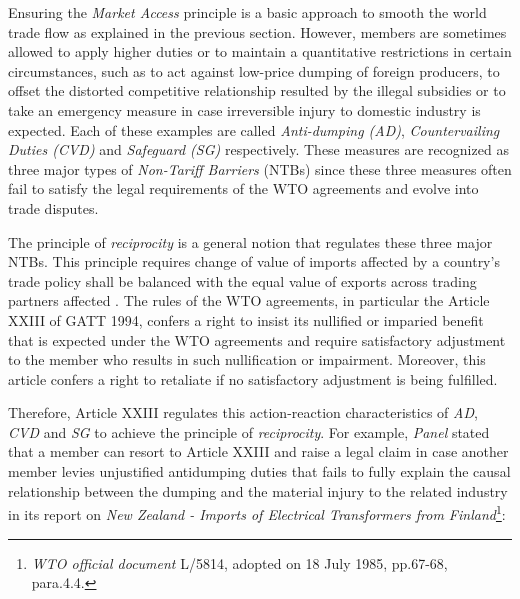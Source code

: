 
 
Ensuring the \textit{Market Access} principle
is a basic approach to smooth the world trade flow as explained in the previous section. %
However, members are sometimes allowed to apply higher duties or to maintain a quantitative restrictions in certain circumstances, such as
to act against low-price dumping of foreign producers, to offset the distorted competitive relationship resulted by the illegal subsidies
or to take an emergency measure in case irreversible injury to domestic industry is expected. Each of these examples
are called \textit{Anti-dumping (AD)}, \textit{Countervailing Duties (CVD)} and \textit{Safeguard (SG)} respectively. These measures are recognized as
three major types of \textit{Non-Tariff Barriers} (NTBs) %
since these three measures often fail to satisfy the legal requirements of the WTO agreements and evolve into trade disputes.
 
The principle of \textit{reciprocity} is a general notion that regulates these three major NTBs.
This principle requires change of value of imports affected by a country's trade policy
shall be balanced with the equal value of exports across trading partners affected \citep{bagwell1999}.
The rules of the WTO agreements, in particular the Article XXIII of GATT 1994,
confers a right to insist its nullified or imparied benefit that is expected under the WTO agreements and require satisfactory adjustment to the member
who results in such nullification or impairment. Moreover, this article confers a right to retaliate if no satisfactory adjustment is being fulfilled.
 
Therefore, Article XXIII regulates this action-reaction characteristics of \textit{AD}, \textit{CVD} and \textit{SG} to achieve the principle of \textit{reciprocity}. %
For example, \textit{Panel} stated that a member can resort to Article XXIII and raise a legal claim in case another member levies unjustified antidumping duties that fails to fully explain the causal relationship between the dumping and the material injury to the related industry in its report on \textit{New Zealand - Imports of Electrical Transformers from Finland}\footnote{\textit{WTO official document} L/5814, adopted on 18 July 1985, pp.67-68, para.4.4.}:
 
